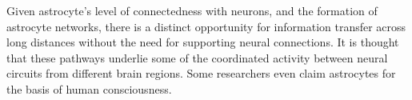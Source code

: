     Given astrocyte's level of connectedness with neurons, and the formation of
    astrocyte networks, there is a distinct opportunity for information transfer
    across long distances without the need for supporting neural
    connections. It is thought that these pathways underlie some of the
    coordinated activity between neural circuits from different brain
    regions. Some researchers even claim astrocytes for the basis of human
    consciousness.
